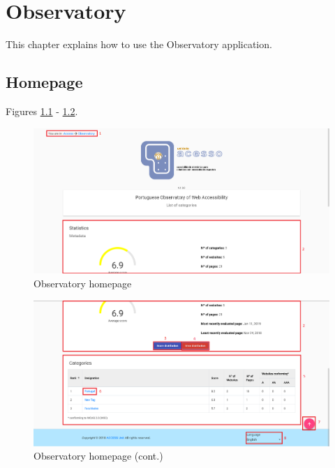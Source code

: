 \chapter{Observatory}

This chapter explains how to use the Observatory application.

\section{Homepage}

Figures \ref{fig:obs_homepage} - \ref{fig:obs_homepage_2}.

\begin{figure}[H]
    \centering
    \includegraphics[width=\linewidth]{lib/images/observatory/observatory_homepage.png}
    \caption{Observatory homepage}
    \label{fig:obs_homepage}
\end{figure}

\clearpage

\begin{figure}[H]
    \centering
    \includegraphics[width=\linewidth]{lib/images/observatory/observatory_homepage_2.png}
    \caption{Observatory homepage (cont.)}
    \label{fig:obs_homepage_2}
\end{figure}

